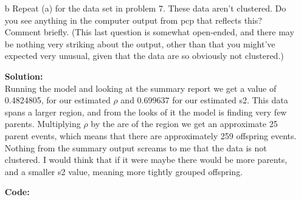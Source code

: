 \documentclass[12pt]{article}
\makeatletter
\theoremstyle{homework}
\newenvironment{exercise}[1]
{\def\@currentlabel{#1}\exercisecore}
{\endexercisecore}
\newcommand{\localhead}[1]{\par\smallskip\noindent\textbf{#1}\nobreak\\}%
\newcommand\solution{\localhead{Solution:}}
\makeatother
\begin{document}
\begin{exercise}{8}
\begin{enumerate}
\begin{enumerate}
      \item[iv] How might we estimate the number of “offspring” per cluster? (Esti-
      mate this!)\\
      \solution We know that there are about $\rho \times \text{area}$ as many parents. Since we know the total number of events in the region we can subtract from that to get the number of offspring. 
      Doing so with an estimated 32 parents we get 30 offspring. By division we get $30/32 \approx .9$ offspring per parent. 
    \end{enumerate}



    \item[b] Repeat (a) for the data set in problem 7. These data aren't clustered. Do
    you see anything in the computer output from pcp that reflects this? Comment briefly. (This last question is somewhat open-ended, and there may
    be nothing very striking about the output, other than that you might've
    expected very unusual, given that the data are so obviously not clustered.)\\
    \solution Running the model and looking at the summary report we get a value of 0.4824805, for our estimated $\rho$ and $0.699637$ for our estimated s2. This data spans a larger region, and from the 
    looks of it the model is finding very few parents. Multiplying $\rho$ by the are of the region we get an approximate 25 parent events, which means that there are approximately 259 offspring events. Nothing from the 
    summary output screams to me that the data is not clustered. I would think that if it were maybe there would be more parents, and a smaller s2 value, meaning more tightly grouped offspring. 


    \textbf{Code:}
    \begin{center}
    
    \end{center}
    \vspace{.15in}
  \end{enumerate}
\end{exercise}

\newpage
\end{document}
